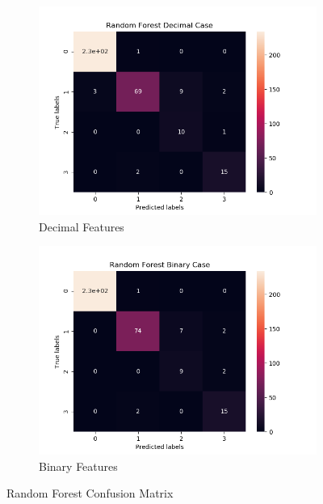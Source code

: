 \begin{figure}[H]
     \centering
     \hspace*{\fill}
     \begin{subfigure}[b]{0.35\textwidth}
         \centering
         \includegraphics[width=\textwidth]{../Figures/Random Forest Decimal Case_conf_mat.png}
         \caption{Decimal Features}
     \end{subfigure}
     \hfill
     \begin{subfigure}[b]{0.35\textwidth}
         \centering
         \includegraphics[width=\textwidth]{../Figures/Random Forest Binary Case_conf_mat.png}
         \caption{Binary Features}
     \end{subfigure}
     \hspace*{\fill}
     \caption{Random Forest Confusion Matrix}
\end{figure}

